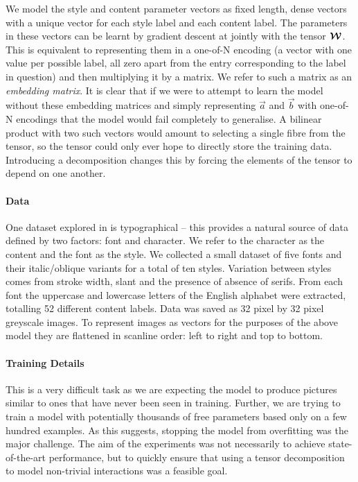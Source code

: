 We model the style and content parameter vectors as fixed length, dense vectors with a unique
vector for each style label and each content label. The parameters in these vectors can be
learnt by gradient descent at jointly with the tensor \(\bm{\mathcal{W}}\). This is equivalent
to representing them in a one-of-N encoding (a vector with one value per possible label, all
zero apart from the entry corresponding to the label in question) and then multiplying it by
a matrix. We refer to such a matrix as an \textit{embedding matrix}. It is clear that if we
were to attempt to learn the model without these embedding matrices and simply representing
\(\vec{a}\) and \(\vec{b}\) with one-of-N encodings that the model would fail completely to
generalise. A bilinear product with two such vectors would amount to selecting a single fibre
from the tensor, so the tensor could only ever hope to directly store the training data.
Introducing a decomposition changes this by forcing the elements of the tensor to depend on
one another.


\paragraph{Data}
One dataset explored in \autocite{Tenenbaum2000} is typographical -- this provides a natural
source of data defined by two factors: font and character. We refer to the character as the
content and the font as the style. We collected a small dataset of five fonts and their
italic/oblique variants for a total of ten styles. Variation between styles comes from stroke
width, slant and the presence of absence of serifs. From each font the uppercase and lowercase
letters of the English alphabet were extracted, totalling 52 different content labels. Data was
saved as 32 pixel by 32 pixel greyscale images. To represent images as vectors for the purposes
of the above model they are flattened in scanline order: left to right and top to bottom.

\paragraph{Training Details}
This is a very difficult task as we are expecting the model to produce pictures similar to ones
that have never been seen in training. Further, we are trying to train a model with potentially
thousands of free parameters based only on a few hundred examples. As this suggests, stopping
the model from overfitting was the major challenge. The aim of the experiments was not
necessarily to achieve state-of-the-art performance, but to quickly ensure that using a tensor
decomposition to model non-trivial interactions was a feasible goal.

